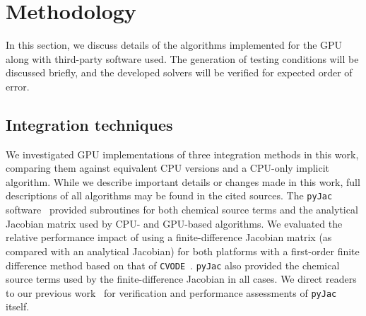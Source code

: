 \documentclass[preprint,review,11pt]{elsarticle}
\begin{document}
\section{Methodology}
\label{S:method}

In this section, we discuss details of the algorithms implemented for the GPU along with third-party software used.
The generation of testing conditions will be discussed briefly, and the developed solvers will be verified for expected order of error.

\subsection{Integration techniques}

We investigated GPU implementations of three integration methods in this work, comparing them against equivalent CPU versions and a CPU-only implicit algorithm.
While we describe important details or changes made in this work, full descriptions of all algorithms may be found in the cited sources.
The \texttt{pyJac} software~\cite{niemeyer_2016_51139,Niemeyer:2015ws,Niemeyer:2016aa} provided subroutines for both chemical source terms and the analytical Jacobian matrix used by CPU- and GPU-based algorithms.
We evaluated the relative performance impact of using a finite-difference Jacobian matrix (as compared with an analytical Jacobian) for both platforms with a first-order finite difference method based on that of \texttt{CVODE}~\cite{Hindmarsh:2005hg}.
\texttt{pyJac} also provided the chemical source terms used by the finite-difference Jacobian in all cases.
We direct readers to our previous work~\cite{Niemeyer:2015ws,Niemeyer:2016aa} for verification and performance assessments of \texttt{pyJac} itself.
\end{document}
